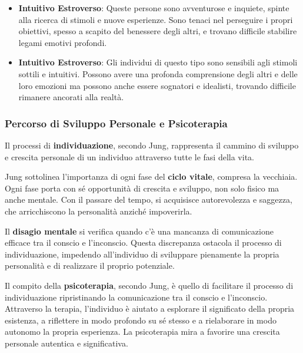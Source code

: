 \documentclass{subfiles}\
\begin{document}
\begin{itemize}
    \item \textbf{Intuitivo Estroverso}: Queste persone sono avventurose e inquiete, spinte 
    alla ricerca di stimoli e nuove esperienze. Sono tenaci nel perseguire i propri obiettivi, 
    spesso a scapito del benessere degli altri, e trovano difficile stabilire legami emotivi 
    profondi.

    \item \textbf{Intuitivo Estroverso}: Gli individui di questo tipo sono sensibili agli 
    stimoli sottili e intuitivi. Possono avere una profonda comprensione degli altri e delle 
    loro emozioni ma possono anche essere sognatori e idealisti, trovando difficile rimanere 
    ancorati alla realtà.
    
\end{itemize}

\subsubsection{Percorso di Sviluppo Personale e Psicoterapia}
Il processi di \textbf{individuazione}, secondo Jung, rappresenta il cammino di sviluppo e 
crescita personale di un individuo attraverso tutte le fasi della vita. 

Jung sottolinea l'importanza di ogni fase del \textbf{ciclo vitale}, compresa la vecchiaia. 
Ogni fase porta con sé opportunità di crescita e sviluppo, non solo fisico ma anche mentale. 
Con il passare del tempo, si acquisisce autorevolezza e saggezza, che arricchiscono la 
personalità anziché impoverirla.

Il \textbf{disagio mentale} si verifica quando c'è una mancanza di comunicazione efficace tra 
il conscio e l'inconscio. Questa discrepanza ostacola il processo di individuazione, impedendo 
all'individuo di sviluppare pienamente la propria personalità e di realizzare il proprio potenziale.

Il compito della \textbf{psicoterapia}, secondo Jung, è quello di facilitare il processo di 
individuazione ripristinando la comunicazione tra il conscio e l'inconscio. 
Attraverso la terapia, l'individuo è aiutato a esplorare il significato della propria esistenza, 
a riflettere in modo profondo su sé stesso e a rielaborare in modo autonomo la propria esperienza. 
La psicoterapia mira a favorire una crescita personale autentica e significativa.
\end{document}
